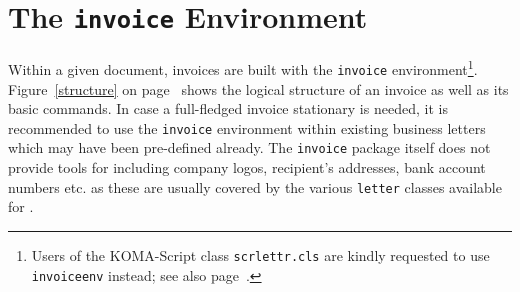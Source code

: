 \documentclass[11pt]{ltxdoc}
\begin{document}
\section{The \texttt{invoice} Environment}

Within a given document, invoices are built with the
\texttt{invoice} environment\footnote{Users of the KOMA-Script 
	class \texttt{scrlettr.cls} are kindly requested to use
	\texttt{invoiceenv} instead; see also page~\pageref{koma}.}.
Figure~\ref{structure} on page~\pageref{structure} shows the
logical structure of an invoice as well as its basic commands.
In case a full-fledged invoice stationary is needed, it is recommended
to use the \texttt{invoice} environment within existing business 
letters which may have been pre-defined already. The \texttt{invoice}
package itself does not provide tools for including company logos,
recipient's addresses, bank account numbers etc. as these are usually
covered by the various \texttt{letter} classes available for \LaTeXe.
\end{document}
